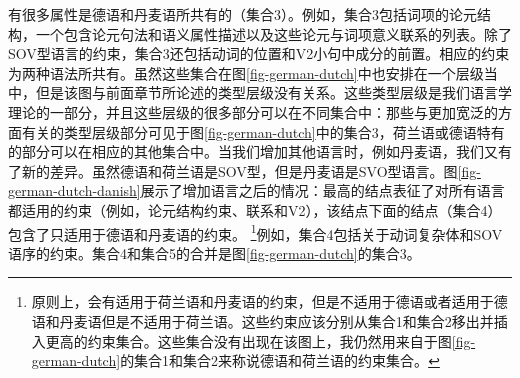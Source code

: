 有很多属性是德语和丹麦语所共有的（集合3）。例如，集合3包括词项的论元结构，一个包含论元句法和语义属性描述以及这些论元与词项意义联系的列表。除了SOV型语言的约束，集合3还包括动词的位置和V2小句中成分的前置。相应的约束为两种语法所共有。虽然这些集合在图\ref{fig-german-dutch}中也安排在一个层级当中，但是该图与前面章节所论述的类型层级没有关系。这些类型层级是我们语言学理论的一部分，并且这些层级的很多部分可以在不同集合中：那些与更加宽泛的方面有关的类型层级部分可见于图\ref{fig-german-dutch}中的集合3，荷兰语或德语特有的部分可以在相应的其他集合中。当我们增加其他语言时，例如丹麦语，我们又有了新的差异。虽然德语和荷兰语是SOV型，但是丹麦语是SVO型语言。图\vref{fig-german-dutch-danish}展示了增加语言之后的情况：最高的结点表征了对所有语言都适用的约束（例如，论元结构约束、联系和V2），该结点下面的结点（集合4）包含了只适用于德语和丹麦语的约束。 \footnote{%
原则上，会有适用于荷兰语和丹麦语的约束，但是不适用于德语或者适用于德语和丹麦语但是不适用于荷兰语。这些约束应该分别从集合1和集合2移出并插入更高的约束集合。这些集合没有出现在该图上，我仍然用来自于图\ref{fig-german-dutch}的集合1和集合2来称说德语和荷兰语的约束集合。  
}例如，集合4包括关于动词复杂体和SOV语序的约束。集合4和集合5的合并是图\ref{fig-german-dutch}的集合3。
